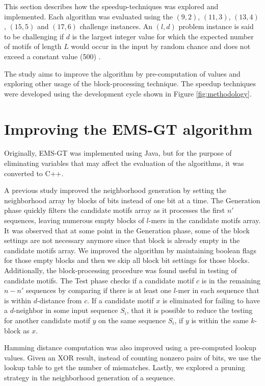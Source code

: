 This section describes how the speedup-techniques was explored and implemented. Each algorithm was evaluated using the $(9, 2)$, $(11, 3)$, $(13, 4)$, $(15, 5)$ and $(17, 6)$ challenge instances. An $(l, d)$ problem instance is said to be challenging if $d$ is the largest integer value for which the expected number of motifs of length $L$ would occur in the input by random chance and does not exceed a constant value (500) \cite{pms2015}.



The study aims to improve the algorithm by pre-computation of values and exploring other usage of the block-processing technique. The speedup techniques were developed using the development cycle shown in Figure \ref{fig:methodology}.

\section{Improving the EMS-GT algorithm}
Originally, EMS-GT was implemented using Java, but for the purpose of eliminating variables that may affect the evaluation of the algorithms, it was converted to C++. 

A previous study \cite{sia2015} improved the neighborhood generation by setting the neighborhood array by blocks of bits instead of one bit at a time. The Generation phase quickly filters the candidate motifs array as it processes the first $n'$ sequences, leaving numerous empty blocks of $l$-mers in the candidate motifs array. It was observed that at some point in the Generation phase, some of the block settings are not necessary anymore since that block is already empty in the candidate motifs array. We improved the algorithm by maintaining boolean flags for those empty blocks and then we skip all block bit settings for those blocks. Additionally, the block-processing procedure was found useful in testing of candidate motifs. The Test phase checks if a candidate motif $c$ is in the remaining $n - n'$ sequences by comparing if there is at least one $l$-mer in each sequence that is within $d$-distance from $c$. If a candidate motif $x$ is eliminated for failing to have a $d$-neighbor in some input sequence $S_i$, that it is possible to reduce the testing for another candidate motif $y$ on the same sequence $S_i$, if $y$ is within the same $k$-block as $x$.

Hamming distance computation was also improved using a pre-computed lookup values. Given an XOR result, instead of counting nonzero pairs of bits, we use the lookup table to get the number of mismatches. Lastly, we explored a pruning strategy in the neighborhood generation of a sequence.

